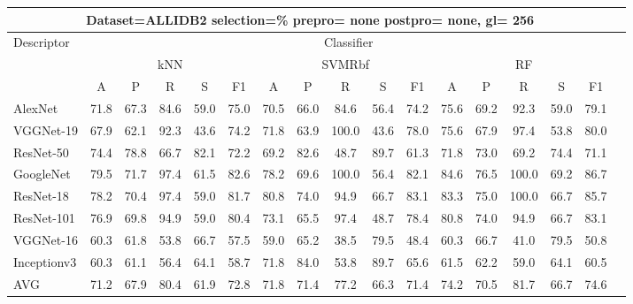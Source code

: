 \documentclass[12pt,italian]{article}
\begin{document}
\begin{tiny}
\begin{longtable}{lcccccccccccccccc}
\toprule
\multicolumn{16}{c}{Dataset=ALLIDB2 selection=\% prepro= none postpro= none, gl= 256} \\ 
\toprule
Descriptor & \multicolumn{15}{c}{Classifier} \\ 
& \multicolumn{5}{c}{kNN} & \multicolumn{5}{c}{SVMRbf} & \multicolumn{5}{c}{RF} \\ 
& A & P & R & S & F1 & A & P & R & S & F1 & A & P & R & S & F1 \\ 
\midrule
AlexNet & 71.8 & 67.3 & 84.6 & 59.0 & 75.0 & 70.5 & 66.0 & 84.6 & 56.4 & 74.2 & 75.6 & 69.2 & 92.3 & 59.0 & 79.1 \\ 
VGGNet-19 & 67.9 & 62.1 & 92.3 & 43.6 & 74.2 & 71.8 & 63.9 & 100.0 & 43.6 & 78.0 & 75.6 & 67.9 & 97.4 & 53.8 & 80.0 \\ 
ResNet-50 & 74.4 & 78.8 & 66.7 & 82.1 & 72.2 & 69.2 & 82.6 & 48.7 & 89.7 & 61.3 & 71.8 & 73.0 & 69.2 & 74.4 & 71.1 \\ 
GoogleNet & 79.5 & 71.7 & 97.4 & 61.5 & 82.6 & 78.2 & 69.6 & 100.0 & 56.4 & 82.1 & 84.6 & 76.5 & 100.0 & 69.2 & 86.7 \\ 
ResNet-18 & 78.2 & 70.4 & 97.4 & 59.0 & 81.7 & 80.8 & 74.0 & 94.9 & 66.7 & 83.1 & 83.3 & 75.0 & 100.0 & 66.7 & 85.7 \\ 
ResNet-101 & 76.9 & 69.8 & 94.9 & 59.0 & 80.4 & 73.1 & 65.5 & 97.4 & 48.7 & 78.4 & 80.8 & 74.0 & 94.9 & 66.7 & 83.1 \\ 
VGGNet-16 & 60.3 & 61.8 & 53.8 & 66.7 & 57.5 & 59.0 & 65.2 & 38.5 & 79.5 & 48.4 & 60.3 & 66.7 & 41.0 & 79.5 & 50.8 \\ 
Inceptionv3 & 60.3 & 61.1 & 56.4 & 64.1 & 58.7 & 71.8 & 84.0 & 53.8 & 89.7 & 65.6 & 61.5 & 62.2 & 59.0 & 64.1 & 60.5 \\ 
\hline
AVG & 71.2 & 67.9 & 80.4 & 61.9 & 72.8 & 71.8 & 71.4 & 77.2 & 66.3 & 71.4 & 74.2 & 70.5 & 81.7 & 66.7 & 74.6 \\ 
\hline
\bottomrule
\end{longtable} 

 \pagebreak 
\end{tiny} 
 
\end{document}
